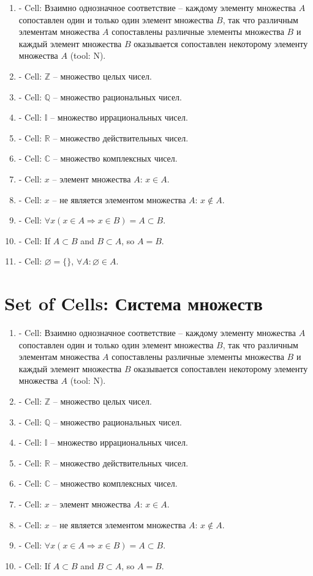 \documentclass{spaceA}
\begin{document}
\begin{enumerate}
  \item - Cell: Взаимно однозначное соответствие -- каждому элементу множества $A$ сопоставлен один и только один элемент множества $B$, так что различным элементам множества $A$ сопоставлены различные элементы множества $B$ и каждый элемент множества $B$ оказывается сопоставлен некоторому элементу множества $A$ (tool: N).
  \item - Cell: $\mathbb{Z}$ -- множество целых чисел.
  \item - Cell: $\mathbb{Q}$ -- множество рациональных чисел.
  \item - Cell: $\mathbb{I}$ -- множество иррациональных чисел.
  \item - Cell: $\mathbb{R}$ -- множество действительных чисел.
  \item - Cell: $\mathbb{C}$ -- множество комплексных чисел.
  \item - Cell: $x$ -- элемент множества $A$: $x \in A$.
  \item - Cell: $x$ -- не является элементом множества $A$: $x \notin A$.
  \item - Cell: $\forall x \left ( x \in A \Rightarrow x \in B \right ) = A \subset B$.
  \item - Cell: If $A \subset B$ and $B \subset A$, so $A = B$.
  \item - Cell: $\varnothing = \{ \}$, $\forall A: \varnothing \in A$.
\end{enumerate}

\section{Set of Cells: Система множеств}

\begin{enumerate}
  \item - Cell: Взаимно однозначное соответствие -- каждому элементу множества $A$ сопоставлен один и только один элемент множества $B$, так что различным элементам множества $A$ сопоставлены различные элементы множества $B$ и каждый элемент множества $B$ оказывается сопоставлен некоторому элементу множества $A$ (tool: N).
  \item - Cell: $\mathbb{Z}$ -- множество целых чисел.
  \item - Cell: $\mathbb{Q}$ -- множество рациональных чисел.
  \item - Cell: $\mathbb{I}$ -- множество иррациональных чисел.
  \item - Cell: $\mathbb{R}$ -- множество действительных чисел.
  \item - Cell: $\mathbb{C}$ -- множество комплексных чисел.
  \item - Cell: $x$ -- элемент множества $A$: $x \in A$.
  \item - Cell: $x$ -- не является элементом множества $A$: $x \notin A$.
  \item - Cell: $\forall x \left ( x \in A \Rightarrow x \in B \right ) = A \subset B$.
  \item - Cell: If $A \subset B$ and $B \subset A$, so $A = B$.
\end{enumerate}
\end{document}
